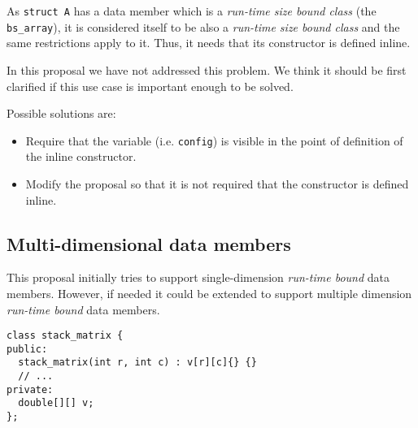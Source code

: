 As \verb+struct A+ has a data member which is a \emph{run-time size bound class}
(the \verb+bs_array+), it is considered itself to be also a \emph{run-time size
bound class} and the same restrictions apply to it. Thus, it needs that its
constructor is defined inline.

In this proposal we have not addressed this problem. We think it should be first
clarified if this use case is important enough to be solved.

Possible solutions are:

\begin{itemize}

\item Require that the variable (i.e. \verb+config+) is visible in the point of definition of the
inline constructor.

\item Modify the proposal so that it is not required that the constructor is
defined inline.

\end{itemize}

\subsection{Multi-dimensional data members}

This proposal initially tries to support single-dimension \emph{run-time bound}
data members. However, if needed it could be extended to support multiple
dimension \emph{run-time bound} data members.

\begin{lstlisting}
class stack_matrix {
public:
  stack_matrix(int r, int c) : v[r][c]{} {}
  // ...
private:
  double[][] v;
};
\end{lstlisting}

